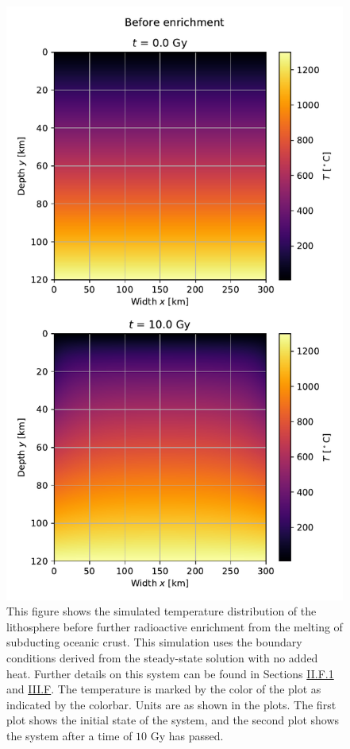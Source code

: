 \documentclass[reprint,english,notitlepage]{revtex4-1}  %
\begin{document}
\begin{figure}[H]
\centering
\includegraphics[width=\columnwidth]{../data/2D_first_heat_before.pdf}
\caption{This figure shows the simulated temperature distribution of the lithosphere before further radioactive enrichment from the melting of subducting oceanic crust. This simulation uses the boundary conditions derived from the steady-state solution with no added heat. Further details on this system can be found in Sections \hyperref[sec:formalism_heat_source_model]{II.F.1} and \hyperref[sec:method_heat_sim]{III.F}. The temperature is marked by the color of the plot as indicated by the colorbar. Units are as shown in the plots. The first plot shows the initial state of the system, and the second plot shows the system after a time of $10$ Gy has passed. } \label{fig:lithosphere_steady_state_project}
\end{figure}
\end{document}
